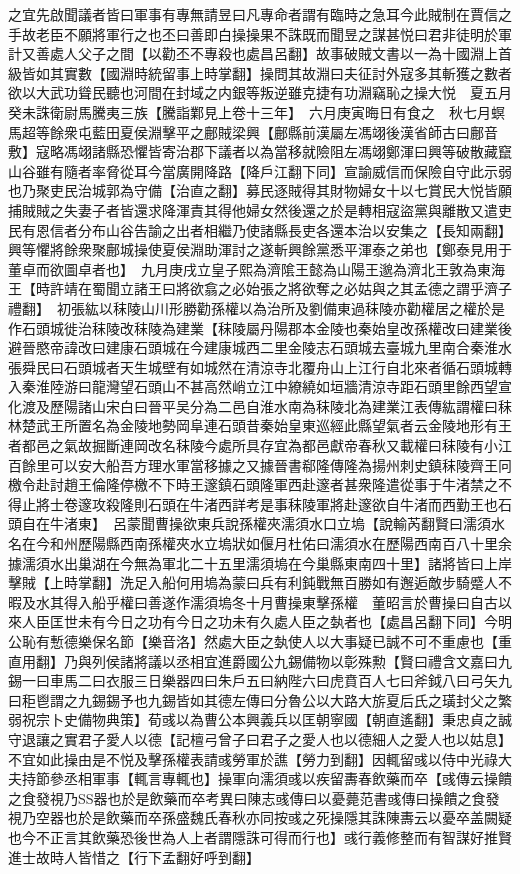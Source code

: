 之宜先啟聞議者皆曰軍事有專無請昱曰凡專命者謂有臨時之急耳今此賊制在賈信之手故老臣不願將軍行之也丕曰善即白操操果不誅既而聞昱之謀甚悦曰君非徒明於軍計又善處人父子之間【以勸丕不專殺也處昌呂翻】故事破賊文書以一為十國淵上首級皆如其實數【國淵時統留事上時掌翻】操問其故淵曰夫征討外寇多其斬獲之數者欲以大武功聳民聽也河間在封域之内銀等叛逆雖克捷有功淵竊恥之操大悦　夏五月癸未誅衛尉馬騰夷三族【騰詣鄴見上卷十三年】　六月庚寅晦日有食之　秋七月螟　馬超等餘衆屯藍田夏侯淵擊平之鄜賊梁興【鄜縣前漢屬左馮翊後漢省師古曰鄜音敷】寇略馮翊諸縣恐懼皆寄治郡下議者以為當移就險阻左馮翊鄭渾曰興等破散藏竄山谷雖有隨者率脅從耳今當廣開降路【降戶江翻下同】宣諭威信而保險自守此示弱也乃聚吏民治城郭為守備【治直之翻】募民逐賊得其財物婦女十以七賞民大悦皆願捕賊賊之失妻子者皆還求降渾責其得他婦女然後還之於是轉相寇盜黨與離散又遣吏民有恩信者分布山谷告諭之出者相繼乃使諸縣長吏各還本治以安集之【長知兩翻】興等懼將餘衆聚鄜城操使夏侯淵助渾討之遂斬興餘黨悉平渾泰之弟也【鄭泰見用于董卓而欲圖卓者也】　九月庚戌立皇子熙為濟隂王懿為山陽王邈為濟北王敦為東海王【時許靖在蜀聞立諸王曰將欲翕之必始張之將欲奪之必姑與之其孟德之謂乎濟子禮翻】　初張紘以秣陵山川形勝勸孫權以為治所及劉備東過秣陵亦勸權居之權於是作石頭城徙治秣陵改秣陵為建業【秣陵屬丹陽郡本金陵也秦始皇改孫權改曰建業後避晉愍帝諱改曰建康石頭城在今建康城西二里金陵志石頭城去臺城九里南合秦淮水張舜民曰石頭城者天生城壁有如城然在清涼寺北覆舟山上江行自北來者循石頭城轉入秦淮陸游曰龍灣望石頭山不甚高然峭立江中繚繞如垣牆清涼寺距石頭里餘西望宣化渡及歷陽諸山宋白曰晉平吴分為二邑自淮水南為秣陵北為建業江表傳紘謂權曰秣林楚武王所置名為金陵地勢岡阜連石頭昔秦始皇東巡經此縣望氣者云金陵地形有王者都邑之氣故掘斷連岡改名秣陵今處所具存宜為都邑獻帝春秋又載權曰秣陵有小江百餘里可以安大船吾方理水軍當移據之又據晉書郗隆傳隆為揚州刺史鎮秣陵齊王冋檄令赴討趙王倫隆停檄不下時王邃鎮石頭隆軍西赴邃者甚衆隆遣從事于牛渚禁之不得止將士卷邃攻殺隆則石頭在牛渚西詳考是事秣陵軍將赴邃欲自牛渚而西勤王也石頭自在牛渚東】　呂蒙聞曹操欲東兵說孫權夾濡須水口立塢【說輸芮翻賢曰濡須水名在今和州歷陽縣西南孫權夾水立塢狀如偃月杜佑曰濡須水在歷陽西南百八十里余據濡須水出巢湖在今無為軍北二十五里濡須塢在今巢縣東南四十里】諸將皆曰上岸擊賊【上時掌翻】洗足入船何用塢為蒙曰兵有利鈍戰無百勝如有邂逅敵步騎蹙人不暇及水其得入船乎權曰善遂作濡須塢冬十月曹操東擊孫權　董昭言於曹操曰自古以來人臣匡世未有今日之功有今日之功未有久處人臣之埶者也【處昌呂翻下同】今明公恥有慙德樂保名節【樂音洛】然處大臣之埶使人以大事疑已誠不可不重慮也【重直用翻】乃與列侯諸將議以丞相宜進爵國公九錫備物以彰殊勲【賢曰禮含文嘉曰九錫一曰車馬二曰衣服三日樂器四曰朱戶五曰納陛六曰虎賁百人七曰斧鉞八曰弓矢九曰秬鬯謂之九錫錫予也九錫皆如其德左傳曰分魯公以大路大旂夏后氏之璜封父之繁弱祝宗卜史備物典策】荀彧以為曹公本興義兵以匡朝寧國【朝直遙翻】秉忠貞之誠守退讓之實君子愛人以德【記檀弓曾子曰君子之愛人也以德細人之愛人也以姑息】不宜如此操由是不悦及擊孫權表請彧勞軍於譙【勞力到翻】因輒留彧以侍中光祿大夫持節參丞相軍事【輒言專輒也】操軍向濡須彧以疾留夀春飲藥而卒【彧傳云操饋之食發視乃器也於是飲藥而卒考異曰陳志彧傳曰以憂薨范書彧傳曰操饋之食發視乃空器也於是飲藥而卒孫盛魏氏春秋亦同按彧之死操隱其誅陳夀云以憂卒盖闕疑也今不正言其飲藥恐後世為人上者謂隱誅可得而行也】彧行義修整而有智謀好推賢進士故時人皆惜之【行下孟翻好呼到翻】

